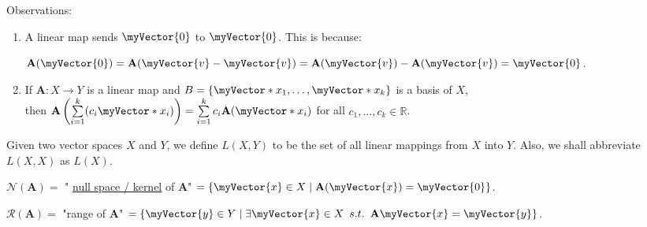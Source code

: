 \documentclass{book}
\newcommand{\exOne}{%
   \color{Purple}%
   \fontsize{14}{16}\selectfont%
}
\newenvironment{myIndent}{%
   \begin{adjustwidth}{2.5em}{0em}%
}{%
   \end{adjustwidth}%
}
\newcommand{\udefine}[1]{{%
   \setulcolor{Red}%
   \setul{0.14em}{0.07em}%
   \ul{#1}%
}}
\newcommand{\suchthat}{ \hspace{0.5em}s.t.\hspace{0.5em}}
\newcommand{\rangeSp}[1]{\mathscr{R}(#1)}
\newcommand{\nullSp}[1]{\mathscr{N}(#1)}
\newcommand{\retTwo}{\hfill\bigbreak}
\newcommand{\mVec}[1]{\myVector{#1}}
\newcommand{\mVecAst}[1]{\myVector*{#1}}
\newcommand{\mMat}[1]{\mathbf{#1}}
\begin{document}
{\begin{myIndent}\exOne
   Observations:
   \begin{enumerate}
      \item A linear map sends $\mVec{0}$ to $\mVec{0}$. This is because: 
      
      {\centering$\mMat{A}(\mVec{0}) = \mMat{A}(\mVec{v} - \mVec{v}) = \mMat{A}(\mVec{v}) - \mMat{A}(\mVec{v}) = \mVec{0}$.\retTwo\par}

      \item If $\mMat{A}: X \longrightarrow Y$ is a linear map and $B = \{\mVecAst{x}_1, \ldots, \mVecAst{x}_k\}$ is a basis of $X$,\\
      then $\mMat{A}\left(\sum\limits_{i=1}^k(c_i\mVecAst{x}_i)\right) = \sum\limits_{i=1}^kc_i\mMat{A}(\mVecAst{x}_i)$ for all $c_1, \ldots, c_k \in \mathbb{R}$.\retTwo
   \end{enumerate}
\end{myIndent}}

Given two vector spaces $X$ and $Y$, we define $L(X, Y)$ to be the set of all linear mappings from $X$ into $Y$. Also, we shall abbreviate $L(X, X)$ as $L(X)$.\retTwo

$\nullSp{\mMat{A}} = $ "\udefine{null space / kernel} of $\mMat{A}$" $ = \{\mVec{x} \in X \mid \mMat{A}(\mVec{x}) = \mVec{0}\}$.\retTwo

$\rangeSp{\mMat{A}} =$ "range of $\mMat{A}$" $ = \{\mVec{y} \in Y \mid \exists \mVec{x} \in X \suchthat \mMat{A}\mVec{x} = \mVec{y}\}$.\retTwo
\end{document}
